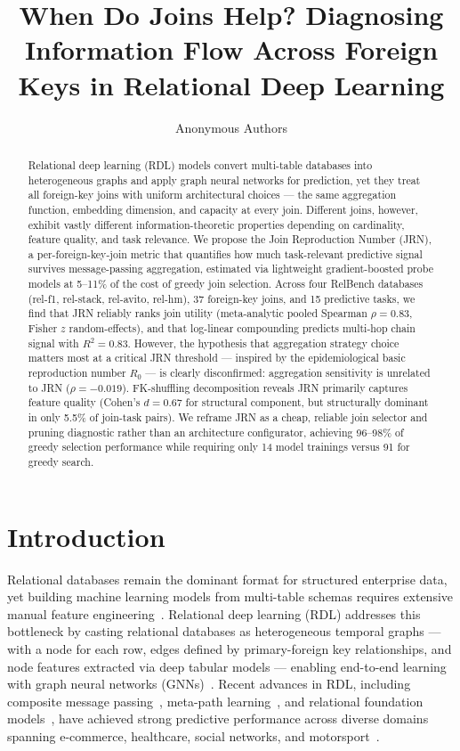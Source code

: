 \documentclass[11pt,letterpaper]{article}
\title{When Do Joins Help? Diagnosing Information Flow Across Foreign Keys in Relational Deep Learning}
\author{%
  Anonymous Authors
}
\date{}
\begin{document}
\maketitle

\begin{abstract}
Relational deep learning (RDL) models convert multi-table databases into heterogeneous graphs and apply graph neural networks for prediction, yet they treat all foreign-key joins with uniform architectural choices --- the same aggregation function, embedding dimension, and capacity at every join. Different joins, however, exhibit vastly different information-theoretic properties depending on cardinality, feature quality, and task relevance. We propose the Join Reproduction Number (JRN), a per-foreign-key-join metric that quantifies how much task-relevant predictive signal survives message-passing aggregation, estimated via lightweight gradient-boosted probe models at 5--11\% of the cost of greedy join selection. Across four RelBench databases (rel-f1, rel-stack, rel-avito, rel-hm), 37 foreign-key joins, and 15 predictive tasks, we find that JRN reliably ranks join utility (meta-analytic pooled Spearman $\rho = 0.83$, Fisher $z$ random-effects), and that log-linear compounding predicts multi-hop chain signal with $R^2 = 0.83$. However, the hypothesis that aggregation strategy choice matters most at a critical JRN threshold --- inspired by the epidemiological basic reproduction number $R_0$ --- is clearly disconfirmed: aggregation sensitivity is unrelated to JRN ($\rho = -0.019$). FK-shuffling decomposition reveals JRN primarily captures feature quality (Cohen's $d = 0.67$ for structural component, but structurally dominant in only 5.5\% of join-task pairs). We reframe JRN as a cheap, reliable join selector and pruning diagnostic rather than an architecture configurator, achieving 96--98\% of greedy selection performance while requiring only 14 model trainings versus 91 for greedy search.
\end{abstract}

\section{Introduction}
\label{sec:introduction}

Relational databases remain the dominant format for structured enterprise data, yet building machine learning models from multi-table schemas requires extensive manual feature engineering~\citep{Fey2023, Kanter2015}. Relational deep learning (RDL) addresses this bottleneck by casting relational databases as heterogeneous temporal graphs --- with a node for each row, edges defined by primary-foreign key relationships, and node features extracted via deep tabular models --- enabling end-to-end learning with graph neural networks (GNNs)~\citep{Fey2023, Robinson2024}. Recent advances in RDL, including composite message passing~\citep{Chen2025}, meta-path learning~\citep{Ferrini2024a, Ferrini2024b}, and relational foundation models~\citep{Fey2025}, have achieved strong predictive performance across diverse domains spanning e-commerce, healthcare, social networks, and motorsport~\citep{Robinson2024, Dwivedi2025}.
\end{document}
